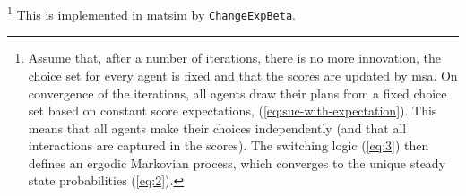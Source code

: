 \footnote{%
%
%
%
%
%
%
%
Assume that, after a number of iterations, there is no more
innovation, \ie the choice set for every agent is fixed and that
the scores are updated by \gls{msa}.
On convergence of the iterations, all agents draw their plans from
a fixed choice set based on constant score expectations, 
\cf (\ref{eq:sue-with-expectation}).
This means that all agents make their choices independently
(and that all interactions are captured in the scores).
The switching logic (\ref{eq:3}) then defines an ergodic Markovian process,
which converges to the unique steady state probabilities (\ref{eq:2}).
%
}
%
This is implemented in \gls{matsim} by \lstinline{ChangeExpBeta}.

